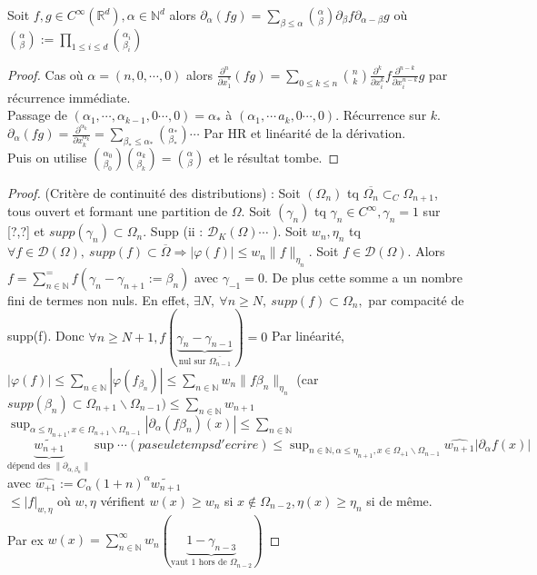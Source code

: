 \begin{lemme}
Soit $f,g\in C^\infty (\mathbb{R} ^d), \alpha \in \mathbb{N} ^d$  alors $\partial_\alpha (fg)=\sum\limits_{\beta\le \alpha }^{} {\alpha \choose \beta} \partial_\beta f\partial_{\alpha -\beta}g$ où ${\alpha \choose \beta}:=\prod\limits_{1\le i\le d}^{} {\alpha _i \choose \beta_i}$
\end{lemme}
\begin{proof}
    Cas où $\alpha =(n,0,\cdots,0)$ alors $\frac{\partial^n}{\partial x_1^^n}(fg)=\sum\limits_{0\le k\le n}^{} {n \choose k} \frac{\partial^k}{\partial x_i^k}f\frac{\partial^{n-k}}{\partial x_i^{n-k}}g$ par récurrence immédiate.\\
    Passage de $(\alpha _1,\cdots, \alpha _{k-1},0\cdots,0)=\alpha _*$ à $(\alpha _1,\cdots\,a_k,0\cdots,0)$. Récurrence sur $k$.\\
    $\partial_{\alpha }(fg)=\frac{\partial^{\alpha _k}}{\partial x_k^{\alpha _k}}=\sum\limits_{\beta_*\le \alpha _*}^{} {\alpha _* \choose \beta_*}\cdots$ Par HR et linéarité de la dérivation. \\
    Puis on utilise ${\alpha _0 \choose \beta_0}{\alpha _k \choose \beta_k}={\alpha \choose\beta}$ et le résultat tombe.
\end{proof}
\begin{proof}
    (Critère de continuité des distributions) : Soit $(\Omega_n)$  tq $\overline{\Omega_n}\subset _C\Omega_{n+1}$, tous ouvert et formant une partition de $\Omega$. Soit $(\gamma_n)$  tq $\gamma_n\in C^\infty , \gamma_n=1$ sur [?,?] et $supp(\gamma_n)\subset \Omega_n$. Supp (ii : $\mathcal{D}_K(\Omega)\cdots$  ). Soit $w_n, \eta_n$
    tq $\forall f\in \mathcal{D}(\Omega),\ supp(f)\subset \overline{\Omega}\Rightarrow |\varphi (f)|\le w_n\|f\|_{\eta_n}. $  Soit $f\in \mathcal{D}(\Omega).$  Alors $f=\sum\limits_{n\in \mathbb{N} }^{=} f(\gamma_n-\gamma_{n+1}:=\beta_n)$ avec $\gamma_{-1}=0$. De plus cette somme a un nombre fini de termes non nuls.
    En effet, $\exists N,\ \forall n\ge N,\ supp(f)\subset \Omega_n, $ par compacité de supp(f). Donc $\forall n\ge N+1,f(\underbrace{\gamma_n-\gamma_{n-1}}_{\text{nul sur }\overline{\Omega_{n-1}}})=0$
    Par linéarité, $|\varphi (f)|\le \sum\limits_{n\in \mathbb{N} }^{} |\varphi (f_{\beta_n})|\le \sum\limits_{n\in \mathbb{N} }^{} w_n\|f\beta_n\|_{\eta_n}$
    (car $supp(\beta_n)\subset \Omega_{n+1}\backslash \Omega_{n-1})\le \sum\limits_{n\in \mathbb{N} }^{} w_{n+1}$
$\sup_{\alpha \le  \eta_{n+1}, x\in \Omega_{n+1}\backslash \Omega_{n-1}}|\partial_\alpha (f\beta_n)(x)|\le \sum\limits_{n\in \mathbb{N} }^{}$
$\underbrace{\tilde{w_{n+1}}}_{\text{dépend des }\|\partial_{\alpha , \beta_n}\|}\sup\cdots(paseuletempsd'ecrire)\le \sup_{n\in \mathbb{N}, \alpha \le \eta_{n+1},x\in \Omega_{+1}\backslash \Omega_{n-1} }\hat{w_{n+1}}|\partial_\alpha f(x)|$
    avec $\hat{w_{+1}}:=C_\alpha (1+n)^\alpha \tilde{w_{n+1}}$ \\
$\le |f|_{w, \eta}$  où $w, \eta$  vérifient $w(x)\ge w_n$ si $x\not\in \Omega_{n-2}, \eta(x)\ge \eta_n$ si de même.\\
Par ex $w(x)=\sum\limits_{n\in \mathbb{N} }^{\infty} w_n(\underbrace{1-\gamma_{n-3}}_{\text{vaut 1 hors de $\Omega_{n-2}$}})$
\end{proof}



